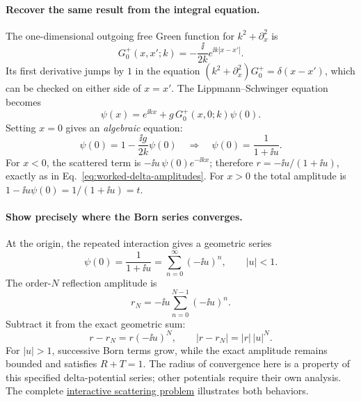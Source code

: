 \paragraph{Recover the same result from the integral equation.}
The one-dimensional outgoing free Green function for
$k^2+\partial_x^2$ is
\begin{equation}
G_0^+(x,x';k)=-\frac{\ii}{2k}e^{\ii k|x-x'|}.
\end{equation}
Its first derivative jumps by $1$ in the equation
$(k^2+\partial_x^2)G_0^+=\delta(x-x')$,
which can be checked on either side of $x=x'$.
The Lippmann--Schwinger equation becomes
\begin{equation}
\psi(x)=e^{\ii kx}+
g\,G_0^+(x,0;k)\psi(0).
\end{equation}
Setting $x=0$ gives an \emph{algebraic} equation:
\begin{equation}
\psi(0)=1-\frac{\ii g}{2k}\psi(0)
\quad\Longrightarrow\quad
\psi(0)=\frac1{1+\ii u}.
\end{equation}
For $x<0$, the scattered term is
$-\ii u\,\psi(0)e^{-\ii kx}$;
therefore $r=-\ii u/(1+\ii u)$,
exactly as in Eq.~\eqref{eq:worked-delta-amplitudes}.
For $x>0$ the total amplitude is
$1-\ii u\psi(0)=1/(1+\ii u)=t$.

\paragraph{Show precisely where the Born series converges.}
At the origin, the repeated interaction gives a geometric series
\begin{equation}
\psi(0)=\frac1{1+\ii u}
=\sum_{n=0}^{\infty}(-\ii u)^n,
\qquad |u|<1.
\end{equation}
The order-$N$ reflection amplitude is
\begin{equation}
r_N=-\ii u\sum_{n=0}^{N-1}(-\ii u)^n.
\end{equation}
Subtract it from the exact geometric sum:
\begin{equation}
r-r_N=r(-\ii u)^N,\qquad
|r-r_N|=|r|\,|u|^N.
\end{equation}
For $|u|>1$, successive Born terms grow, while the exact
amplitude remains bounded and satisfies $R+T=1$.
The radius of convergence here is a property of this
specified delta-potential series; other potentials require
their own analysis. The complete
\href{https://kangqiaoliu.github.io/courses/advanced-quantum-mechanics/companion/labs/IC-05-03/index.html}
{interactive scattering problem} illustrates both behaviors.

